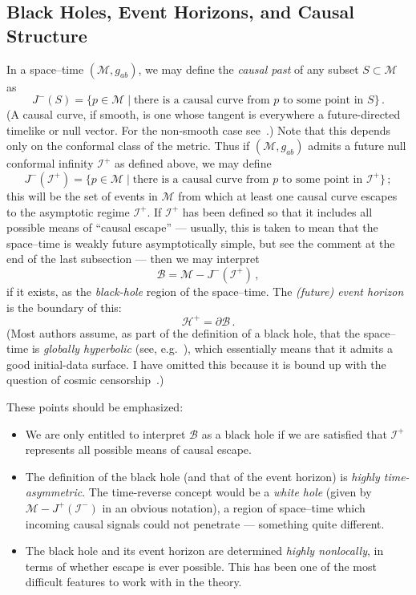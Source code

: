 \documentclass[
%
draft    %
,numberedheadings 
,bibliocites
  ]
  {aipproc}
\newcommand{\scrif}{{{\mathscr I}^{+}}}
\newcommand{\scrip}{{{\mathscr I}^{-}}}
\newcommand{\B}{{\mathscr B}} %
\newcommand{\Hf}{{{\mathscr H}^{+}}} %
\newcommand{\MM}{{\mathscr M}}
\begin{document}
\subsection{Black Holes, Event Horizons, and Causal Structure}

In a space--time $(\MM ,g_{ab})$, we may define the {\em causal past} of any subset $S\subset \MM$ as
\begin{equation} 
  J^-(S)=\{  p\in \MM\mid\mbox{there is a causal curve from }p\mbox{ to some point in }S\}\, .
\end{equation}
(A causal curve, if smooth, is one whose tangent is everywhere a future-directed timelike or null vector.  For the non-smooth case see~\citep{Penrose:1972}.)  Note that this depends only on the conformal class of the metric.  Thus if $(\MM ,g_{ab})$ admits a future null conformal infinity $\scrif$ as defined above, we may define
\begin{equation} 
  J^-(\scrif )=\{  p\in \MM\mid\mbox{there is a causal curve from }p\mbox{ to some point in }\scrif\}\, ;
\end{equation}
this will be the set of events in $\MM$ from which at least one causal curve escapes to the asymptotic regime $\scrif$.  If $\scrif$ has been defined so that it includes all possible means of ``causal escape'' --- usually, this is taken to mean that the space--time is weakly future asymptotically simple, but see the comment at the end of the last subsection --- then we may interpret
\begin{equation}
 \B =\MM -J^-(\scrif )\, ,
\end{equation}
if it exists, as the {\em black-hole} region of the space--time.  The {\em (future) event horizon} is the boundary of this:
\begin{equation}
\Hf =\partial\B\, .
\end{equation}
(Most authors assume, as part of the definition of a black hole, that the space--time is {\em globally hyperbolic} (see, e.g.~\citep{Penrose:1972}), which essentially means that it admits a good initial-data surface.  I have omitted this because it is bound up with the question of cosmic censorship~\citep{Penrose:1980}.)

These points should be emphasized:  
\begin{itemize}
\item
We are only entitled to interpret $\B$ as a black hole if we are satisfied that $\scrif$ represents all possible means of causal escape.
\item
The definition of the black hole (and that of the event horizon) is {\em highly time-asymmetric}.  The time-reverse concept would be a {\em white hole} (given by $\MM -J^+(\scrip )$ in an obvious notation), a region of space--time which incoming causal signals could not penetrate --- something quite different.
\item
The black hole and its event horizon are determined {\em highly nonlocally}, in terms of whether escape is ever possible.  This has been one of the most difficult features to work with in the theory.
\end{itemize}
\end{document}
